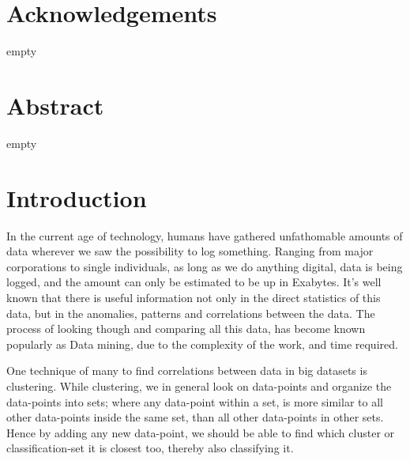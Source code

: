 \documentclass[a4paper]{article}
\begin{document}
%
%


%
%
\section*{Acknowledgements}
empty
\newpage

%
%
\section*{Abstract}
empty
\newpage

%
%
\tableofcontents
\newpage

%
%
\listofalgorithms
\newpage



%
%
\section{Introduction}
In the current age of technology, humans have gathered unfathomable amounts of data wherever
we saw the possibility to log something. Ranging from major corporations to single individuals,
as long as we do anything digital, data is being logged, and the amount can only be estimated to be
up in Exabytes.
It's well known that there is useful information not only in the direct statistics of this data,
but in the anomalies, patterns and correlations between the data. The process of looking though and
comparing all this data, has become known popularly as Data mining, due to the complexity of the work,
and time required.

One technique of many to find correlations between data in big datasets is clustering. While
clustering, we in general look on data-points and organize the data-points
into sets; where any data-point within a set, is more similar to all other data-points inside
the same set, than all other data-points in other sets. Hence by adding any new
data-point, we should be able to find which cluster or classification-set it is closest too,
thereby also classifying it. \cite{gan07}
\end{document}
